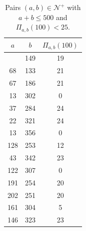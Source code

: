 \documentclass[12pt, a4paper,  reqno, english]{amsart}%
\numberwithin{equation}{section}
\theoremstyle{definition}
\renewcommand{\leq}{\leqslant}
\begin{document}
\begin{table}[ht]
\begin{center}
\begin{tabular}{| c| c |  c   | }
\hline\newline
 $a$ & $b$  &   $\Pi_{a,b}(100)$ \\
\hline\newline
26 &  149 & 19 \\
68 &  133 & 21 \\   
67 &  186 & 21 \\   
13 &302 &0 \\   
37 &284 &24 \\   
22 &321 &24 \\   
13 &356 & 0 \\
128 & 253 & 12 \\   
43 & 342 & 23 \\   
122 & 307 & 0 \\   
191 & 254 & 20 \\  
 202 & 251 & 20 \\   
 161 & 304 & 5 \\   
 146 & 323 & 23\\
  \hline 
\end{tabular}
    \end{center} \smallskip
      \caption{Pairs $(a,b)\in \mathcal N^+$ with $a+b\leq 500$ and $\Pi_{a,b}(100)< 25$.}
    \end{table}               
    
\end{document}
